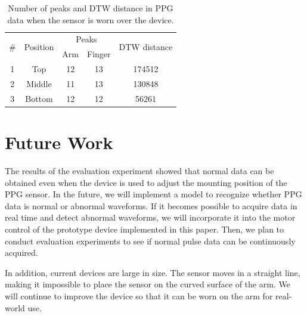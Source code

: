 \documentclass[sigconf]{acmart}
\begin{document}
\begin{table}[!t]
  \small
  \centering
  \caption{Number of peaks and DTW distance in PPG data when the sensor is worn over the device.}
  \begin{tabular}{c|c|cc|c} \hline\hline
    \multirow{2}{*}{\#} & \multirow{2}{*}{Position} & \multicolumn{2}{c|}{Peaks} & \multirow{2}{*}{DTW distance} \\ \cline{3-4}
     &                   & Arm & Finger & \\ \hline
    1 & Top & 12 & 13 & 174512 \\
    2 & Middle & 11 & 13 & 130848 \\
    3 & Bottom & 12 & 12 & 56261 \\ \hline
  \end{tabular}
  \label{tab:auto}
\end{table}



\section{Future Work}
\label{sec:future_work}
The results of the evaluation experiment showed that normal data can be obtained even when the device is used to adjust the mounting position of the PPG sensor. In the future, we will implement a model to recognize whether PPG data is normal or abnormal waveforms. If it becomes possible to acquire data in real time and detect abnormal waveforms, we will incorporate it into the motor control of the prototype device implemented in this paper. Then, we plan to conduct evaluation experiments to see if normal pulse data can be continuously acquired.\par

In addition, current devices are large in size. The sensor moves in a straight line, making it impossible to place the sensor on the curved surface of the arm. We will continue to improve the device so that it can be worn on the arm for real-world use.
\end{document}
